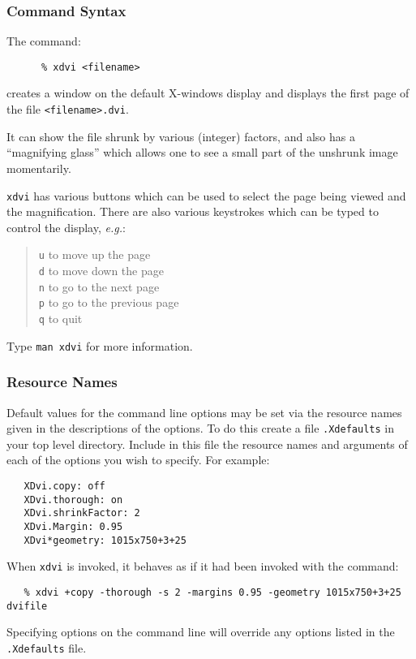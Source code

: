 \documentclass[11pt,twoside]{article}
\begin{document}
\subsubsection{Command Syntax}
The command:
\begin{verbatim}
      % xdvi <filename>
\end{verbatim}
creates a window on the default X-windows display and displays the first
page of the file \texttt{<filename>.dvi}.

It can show the file shrunk by various
(integer) factors, and also has a ``magnifying glass'' which allows one
to see a small part of the unshrunk image momentarily.

\texttt{xdvi} has various buttons which can be used to select the page
being viewed and the magnification. There are also various
keystrokes which can be typed to control the display, \emph{e.g.}:
\begin{quote}
  \texttt{u} to move up the page \\
  \texttt{d} to move down the page \\
  \texttt{n} to go to the next page \\
  \texttt{p} to go to the previous page \\
  \texttt{q} to quit
\end{quote}

Type \texttt{man xdvi} for more information.

\subsubsection{Resource Names}

Default values for the command line options may be set via the resource names
given in the descriptions of the options. To do this
create a file \texttt{.Xdefaults} in your top level directory.
Include in this file the resource names
and arguments of each of the options you wish to specify.  For example:
\begin{verbatim}
   XDvi.copy: off
   XDvi.thorough: on
   XDvi.shrinkFactor: 2
   XDvi.Margin: 0.95
   XDvi*geometry: 1015x750+3+25
\end{verbatim}
   When \verb+xdvi+ is invoked, it behaves as if it had been invoked with the
   command:
\begin{verbatim}
   % xdvi +copy -thorough -s 2 -margins 0.95 -geometry 1015x750+3+25 dvifile
\end{verbatim}
   Specifying options on the command line will override any options listed
   in the \texttt{.Xdefaults} file.
\end{document}

